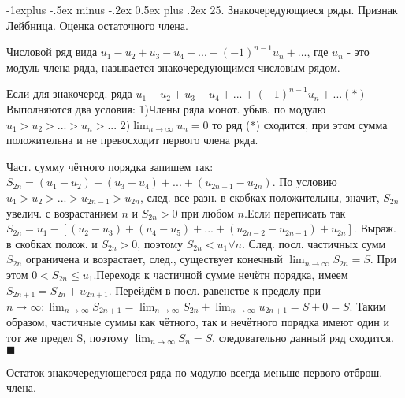 \documentclass[unicode,10pt, landscape]{article}
\makeatletter
\renewcommand{\subsection}{\@startsection{subsection}{2}{0mm}%
                                {-1explus -.5ex minus -.2ex}%
                                {0.5ex plus .2ex}%
                                {\normalfont\normalsize\bfseries}}
\newenvironment{Proof} %
{\par\noindent{\bf Док-во:}} %
{\hfill$\scriptstyle\blacksquare$}
\makeatother
\begin{document}
\begin{multicols}{4}
 \subsection{25. Знакочередующиеся ряды. Признак Лейбница. Оценка остаточного члена.}
 \begin{Def}
  Числовой ряд вида $u_{1}-u_2+u_3-u_4+...+(-1)^{n-1}u_n+...$, где $u_n$ - это модуль члена ряда, называется знакочередующимся числовым рядом.
 \end{Def}
 \begin{Th}
  Если для знакочеред.  ряда
  $u_{1}-u_2+u_3-u_4+...+(-1)^{n-1}u_n+...(*)$
  Выполняются два условия:
  1)Члены ряда монот. убыв. по модулю $u_{1} > u_2 > ...> u_n > ...$
  2)$\lim_{n \to \infty} u_n = 0$
  то ряд (*) сходится, при этом сумма положительна и не превосходит первого члена ряда.
  \begin{Proof}
   Част. сумму чётного порядка запишем так: $S_{2n}=(u_{1}-u_2)+(u_3-u_4)+...+(u_{2n-1}-u_{2n})$.
   По условию $u_{1} > u_2 > ...> u_{2n-1} > u_{2n}$, след. все разн. в скобках положительны, значит, $S_{2n}$ увелич. с возрастанием $n$  и $ S_{2n}>0$ при любом $n$.Если переписать так $S_{2n}=u_{1}-[(u_2-u_3)+(u_4-u_5)+...+(u_{2n-2}-u_{2n-1})+u_{2n}]$. Выраж. в скобках полож. и  $S_{2n}>0$, поэтому  $S_{2n}<u_1 \forall n$. След. посл. частичных сумм $S_{2n}$ ограничена и возрастает, след., существует конечный  $\lim_{n \to \infty}S_{2n}=S$. При этом $ 0<S_{2n}\leq u_1$.Переходя к частичной сумме нечётн порядка, имеем $S_{2n+1}=S_{2n}+u_{2n+1}$. Перейдём в посл. равенстве к пределу при $n \to \infty:\lim_{n \to \infty}S_{2n+1}=\lim_{n \to \infty}S_{2n}+\lim_{n \to \infty}u_{2n+1}=S+0=S$. Таким образом, частичные суммы как чётного, так и нечётного порядка имеют один и тот же предел S, поэтому $\lim_{n \to \infty}S_{n}=S$, следовательно данный ряд сходится.
  \end{Proof}
 \end{Th}
 Остаток знакочередующегося ряда по модулю всегда меньше первого отброш. члена.

\end{multicols}
\end{document}
